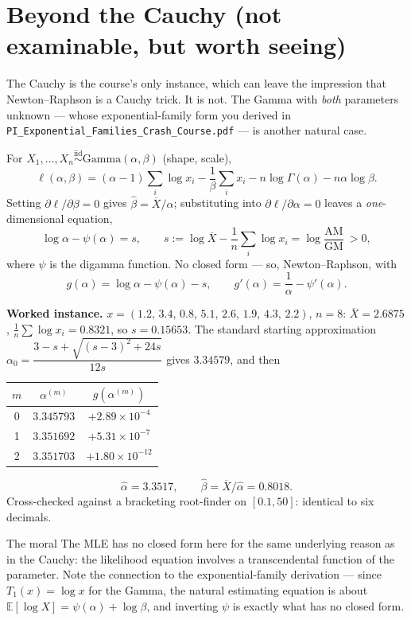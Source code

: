 \documentclass[11pt]{article}
\newcommand{\E}{\mathbb{E}}
\newcommand{\Xbar}{\overline{X}}
\newcommand{\iid}{\overset{\text{iid}}{\sim}}
\begin{document}
\section{Beyond the Cauchy (not examinable, but worth seeing)}

The Cauchy is the course's only instance, which can leave the impression that Newton--Raphson
is a Cauchy trick. It is not. The Gamma with \emph{both} parameters unknown --- whose
exponential-family form you derived in \texttt{PI\_Exponential\_Families\_Crash\_Course.pdf}
--- is another natural case.

For $X_1,\dots,X_n\iid\mathrm{Gamma}(\alpha,\beta)$ (shape, scale),
\[
\ell(\alpha,\beta)=(\alpha-1)\sum_i\log x_i-\frac{1}{\beta}\sum_i x_i-n\log\Gamma(\alpha)-n\alpha\log\beta .
\]
Setting $\partial\ell/\partial\beta=0$ gives $\hat\beta=\Xbar/\alpha$; substituting into
$\partial\ell/\partial\alpha=0$ leaves a \emph{one}-dimensional equation,
\[
\boxed{\ \log\alpha-\psi(\alpha)=s,\qquad
s:=\log\Xbar-\frac1n\sum_i\log x_i=\log\frac{\text{AM}}{\text{GM}}\ >0,\ }
\]
where $\psi$ is the digamma function. No closed form --- so, Newton--Raphson, with
\[
g(\alpha)=\log\alpha-\psi(\alpha)-s,\qquad g'(\alpha)=\frac1\alpha-\psi'(\alpha).
\]

\textbf{Worked instance.} $x=(1.2,\,3.4,\,0.8,\,5.1,\,2.6,\,1.9,\,4.3,\,2.2)$, $n=8$:
$\Xbar=2.6875$, $\frac1n\sum\log x_i=0.8321$, so $s=0.15653$. The standard starting
approximation $\alpha_0=\dfrac{3-s+\sqrt{(s-3)^2+24s}}{12s}$ gives $3.34579$, and then

\begin{center}
\renewcommand{\arraystretch}{1.3}
\begin{tabular}{@{}ccc@{}}
\toprule
$m$ & $\alpha^{(m)}$ & $g(\alpha^{(m)})$ \\
\midrule
0 & $3.345793$ & $+2.89\times10^{-4}$ \\
1 & $3.351692$ & $+5.31\times10^{-7}$ \\
2 & $3.351703$ & $+1.80\times10^{-12}$ \\
\bottomrule
\end{tabular}
\end{center}
\[
\hat\alpha=3.3517,\qquad \hat\beta=\Xbar/\hat\alpha=0.8018 .
\]
Cross-checked against a bracketing root-finder on $[0.1,50]$: identical to six decimals.

\begin{idea}{The moral}
The MLE has no closed form here for the same underlying reason as in the Cauchy: the
likelihood equation involves a transcendental function of the parameter. Note the connection
to the exponential-family derivation --- since $T_1(x)=\log x$ for the Gamma, the natural
estimating equation is about $\E[\log X]=\psi(\alpha)+\log\beta$, and inverting $\psi$ is
exactly what has no closed form.
\end{idea}
\end{document}
